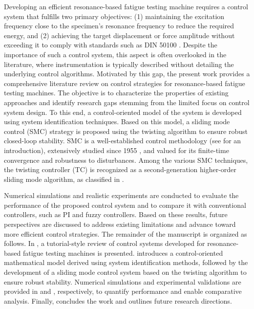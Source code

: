 \documentclass[lettersize,journal]{IEEEtran}
\begin{document}
Developing an efficient resonance-based fatigue testing machine requires a control system that fulfills two primary objectives: (1) maintaining the excitation frequency close to the specimen’s resonance frequency to reduce the required energy, and (2) achieving the target displacement or force amplitude without exceeding it to comply with standards such as DIN 50100 \cite{DIN_standard}. Despite the importance of such a control system, this aspect is often overlooked in the literature, where instrumentation is typically described without detailing the underlying control algorithms. Motivated by this gap, the present work provides a comprehensive literature review on control strategies for resonance-based fatigue testing machines. The objective is to characterize the properties of existing approaches and identify research gaps stemming from the limited focus on control system design. To this end, a control-oriented model of the system is developed using system identification techniques. Based on this model, a sliding mode control (SMC) strategy is proposed using the twisting algorithm to ensure robust closed-loop stability. SMC is a well-established control methodology (see \cite{Slotine1991} for an introduction), extensively studied since 1955 \cite{Utkin1955}, and valued for its finite-time convergence and robustness to disturbances. Among the various SMC techniques, the twisting controller (TC) \cite{UTKIN2020_higher_order, Orlov_twisting, Utkin_twisting, POLYAKOV_twisting, Santiesteban_twisting, TORRESGONZALEZ2017_twisting, Santiesteban_twisting} is recognized as a second-generation higher-order sliding mode algorithm, as classified in \cite{Fridman2015}.


Numerical simulations and realistic experiments are conducted to evaluate the performance of the proposed control system and to compare it with conventional controllers, such as PI and fuzzy controllers. Based on these results, future perspectives are discussed to address existing limitations and advance toward more efficient control strategies. The remainder of the manuscript is organized as follows. In , a tutorial-style review of control systems developed for resonance-based fatigue testing machines is presented.  introduces a control-oriented mathematical model derived using system identification methods, followed by the development of a sliding mode control system based on the twisting algorithm to ensure robust stability. Numerical simulations and experimental validations are provided in  and , respectively, to quantify performance and enable comparative analysis. Finally,  concludes the work and outlines future research directions.
\end{document}
